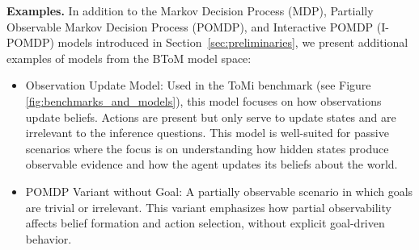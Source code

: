 \textbf{Examples.} In addition to the Markov Decision Process (MDP), Partially Observable Markov Decision Process (POMDP), and Interactive POMDP (I-POMDP) models introduced in Section~\ref{sec:preliminaries}, we present additional examples of models from the BToM model space:
\begin{itemize}
\setlength\itemsep{0pt}
    \item Observation Update Model: Used in the ToMi benchmark (see Figure \ref{fig:benchmarks_and_models}), this model focuses on how observations update beliefs. Actions are present but only serve to update states and are irrelevant to the inference questions. This model is well-suited for passive scenarios where the focus is on understanding how hidden states produce observable evidence and how the agent updates its beliefs about the world.
    \item POMDP Variant without Goal: A partially observable scenario in which goals are trivial or irrelevant. This variant emphasizes how partial observability affects belief formation and action selection, without explicit goal-driven behavior.
\end{itemize}
